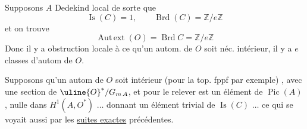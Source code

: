 
Supposons $A$  Dedekind  local
 de sorte que
\[
\operatorname{Is}(C)=1,\qquad\operatorname{Brd}(C)=\mathbb Z/e\mathbb Z
\]
et on trouve
\[
\operatorname{Aut\,ext}(O)=\operatorname{Brd}C=\mathbb Z/e\mathbb Z
\]
Donc il y a obstruction locale à ce qu'un autom. de $O$ soit néc. intérieur, il y a $e$ classes d'autom de $O$.

Supposons  qu'un autom de $O$ soit  intérieur (pour la top. fppf par exemple)
,
avec une section de $\uline{O}^*/G_{m\,A}$, et 
pour le relever est un élément de $\operatorname{Pic}(A)$, nulle dans
 $H^1(A,O^*)$
$\ldots$ donnant un élément trivial de $\operatorname{Is}(C)$ $\ldots$
ce qui se voyait aussi par les \uline{suites exactes} précédentes.

